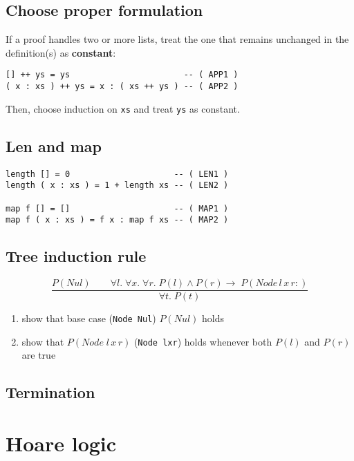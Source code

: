 \documentclass[10pt,a4paper,landscape]{article}
\begin{document}
\begin{multicols*}{3}
\subsection*{Choose proper formulation}
If a proof handles two or more lists, treat the one that remains unchanged in the definition(s) as \textbf{constant}:
\begin{lstlisting}
[] ++ ys = ys                       -- ( APP1 )
( x : xs ) ++ ys = x : ( xs ++ ys ) -- ( APP2 )
\end{lstlisting}
Then, choose induction on \texttt{xs} and treat \texttt{ys} as constant.
\subsection*{Len and map}
\begin{lstlisting}
length [] = 0                     -- ( LEN1 )
length ( x : xs ) = 1 + length xs -- ( LEN2 )

map f [] = []                     -- ( MAP1 )
map f ( x : xs ) = f x : map f xs -- ( MAP2 )
\end{lstlisting}

\subsection*{Tree induction rule}
\begin{displaymath}
\frac{P(Nul)\qquad \forall l.\; \forall x.\; \forall r.\; P(l) \land P(r) \rightarrow\; P(Node\,l\,x\,r:)}{\forall t.\; P(t)}
\end{displaymath}
\begin{enumerate}
\item show that base case (\verb|Node Nul|) $P(Nul)$ holds
\item show that $P(Node\;l\,x\,r)$ (\verb|Node lxr|) holds whenever both $P(l)$ and $P(r)$ are true
\end{enumerate}
\subsection*{Termination}

\section{Hoare logic}
%
\end{multicols*}
\end{document}
